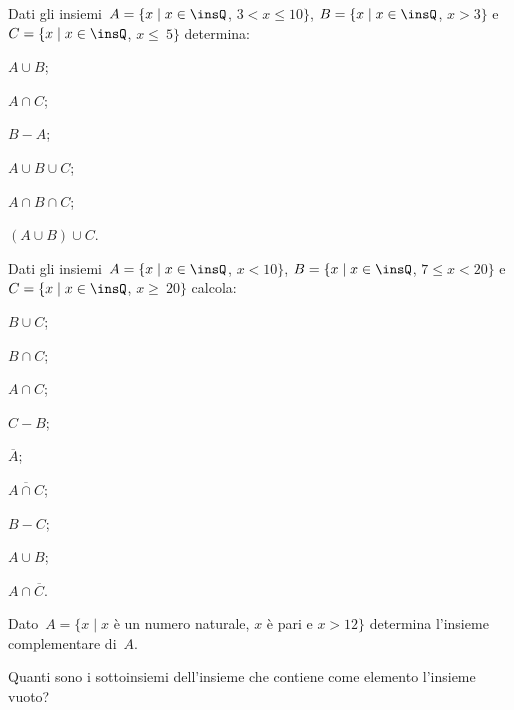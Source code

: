 \begin{esercizio}
\label{ese:\thechapter.130}
Dati gli insiemi~$A=\{x\mid x\in\insQ$, $3<x\le 10\}$, $B=\{x\mid x\in\insQ$, $x>3\}$ e
$C=\{x\mid x\in\insQ$, $x\le~5\}$ determina:
\begin{multicols}{3}
\begin{enumeratea}
\item $A\cup B$;
\item $A\cap C$;
\item $B-A$;
\item $A\cup B\cup C$;
\item $A\cap B\cap C$;
\item $(A\cup B)\cup C$.
\end{enumeratea}
\end{multicols}
\end{esercizio}

\begin{esercizio}
\label{ese:\thechapter.131}
Dati gli insiemi~$A=\{x\mid x\in\insQ$, $x<10\}$, $B=\{x\mid x\in\insQ$, $7\le x<20\}$ e
$C=\{x\mid x\in\insQ$, $x\ge~20\}$ calcola:
\begin{multicols}{3}
\begin{enumeratea}
\item $B\cup C$;
\item $B\cap C$;
\item $A\cap C$;
\item $C-B$;
\item $\overline{A}$;
\item $\overline{A\cap C}$;
\item $B-C$;
\item $A\cup B$;
\item $A\cap \overline{C}$.
\end{enumeratea}
\end{multicols}
\end{esercizio}

\begin{esercizio}
\label{ese:\thechapter.132}
Dato~$A = \{x\mid x$ è un numero naturale, $x$ è pari e $x>12\}$ determina l'insieme complementare di~$A$.
\end{esercizio}

\begin{esercizio}
\label{ese:\thechapter.133}
Quanti sono i sottoinsiemi dell'insieme che contiene come elemento
l'insieme vuoto?
\end{esercizio}

